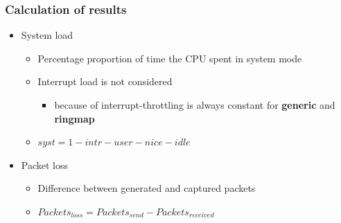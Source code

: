 \documentclass{beamer}
\begin{document}
%
%
\begin{frame}
\frametitle{Calculation of results}
\begin{itemize}
	\item System load
		\begin{itemize}
			\item Percentage proportion of time the CPU spent in system mode
			\item Interrupt load is not considered
				\begin{itemize}
					\item because of interrupt-throttling is always constant for \textbf{generic} and \textbf{ringmap}
				\end{itemize}
			\item $syst = 1 - intr - user - nice - idle$\newline
		\end{itemize}
	\item Packet loss
		\begin{itemize}
			\item Difference between generated and captured packets
			\item $Packets_{loss} = Packets_{send} - Packets_{received}$
		\end{itemize}
\end{itemize}
\end{frame}
\end{document}
